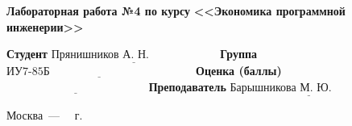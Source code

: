 \begin{titlepage}
	\begin{center}
		\Large\textbf{Лабораторная работа №4 по курсу}
		\Large\textbf{\hspace*{38pt}<<Экономика программной инженерии>>}\newline\newline\newline
	\end{center}
	
	\noindent\textbf{Студент} $\underline{\text{Прянишников А. Н.~~~~~~~~~~~~~~~~~~}}$\newline\newline
	\noindent\textbf{Группа} $\underline{\text{ИУ7-85Б~~~~~~~~~~~~~~~~~~~~~~~~~~~~~~~~~~~~~~}}$\newline\newline
	\noindent\textbf{Оценка (баллы)} $\underline{\text{~~~~~~~~~~~~~~~~~~~~~~~~~~~~~~~~~~~~~}}$\newline\newline
	\noindent\textbf{Преподаватель} $\underline{\text{Барышникова~М.~Ю.~~~~~~~~~~~~~~~}}$\newline
	
	\begin{center}
		\vfill
		Москва~---~\the\year
		~г.
	\end{center}
	\restoregeometry
\end{titlepage}